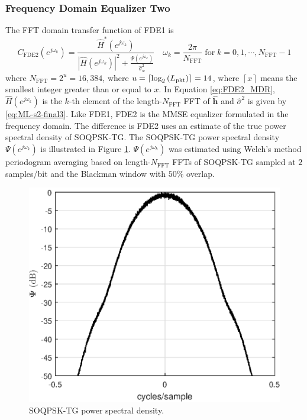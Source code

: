 \subsubsection{Frequency Domain Equalizer Two}
The FFT domain transfer function of FDE1 is \cite[eq. (12)]{williams2013linear}
\begin{equation}
C_\text{FDE2}(e^{j\omega_k}) = \frac{\hat{H}^\ast(e^{j\omega_k})}  {|\hat{H}(e^{j\omega_k})|^2  +  \frac{\Psi(e^{j\omega_k})}{\hat{\sigma}^2_w}} \quad
\omega_k = \frac{2\pi}{N_\text{FFT}} \;
\text{for} \;
k=0,1,\cdots,N_\text{FFT}-1
\label{eq:FDE2_MDR}
\end{equation}
where $N_\text{FFT} = 2^u = 16{,}384$, where $u = {\left\lceil \log_2{\left(L_\text{pkt}\right)}  \right\rceil} = 14$,
where $\left\lceil x  \right\rceil$ means the smallest integer greater than or equal to $x$.
In Equation \eqref{eq:FDE2_MDR}, $\hat{H}(e^{j\omega_k})$ is the $k$-th element of the length-$N_\text{FFT}$ FFT of $\mathbf{\hat{h}}$ and $\hat{\sigma}^2$ is given by \eqref{eq:ML-s2-final3}.
Like FDE1, FDE2 is the MMSE equalizer formulated in the frequency domain.
The difference is FDE2 uses an estimate of the true power spectral density of SOQPSK-TG.
The SOQPSK-TG power spectral density $\Psi(e^{j\omega_k})$ is illustrated in Figure \ref{fig:SOQPSK_spectrum_MDR}.
$\Psi(e^{j\omega_k})$ was estimated using Welch's method periodogram averaging based on length-$N_\text{FFT} $ FFTs of SOQPSK-TG sampled at $2$ samples/bit and the Blackman window with $50\%$ overlap.
\begin{figure}
	\centering\includegraphics[width=5in]{figures/eq_equations/FDE2_spectrum_PSI.eps}
	\caption{SOQPSK-TG power spectral density.}
	\label{fig:SOQPSK_spectrum_MDR}
\end{figure}

